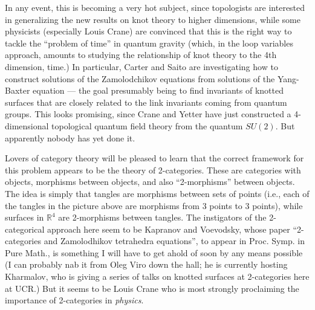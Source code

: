 \documentclass{article}
\def\tightlist{}
\renewcommand{\texttt}[1]{%
  \begingroup
  \ttfamily
  \begingroup\lccode`~=`/\lowercase{\endgroup\def~}{/\discretionary{}{}{}}%
  \begingroup\lccode`~=`[\lowercase{\endgroup\def~}{[\discretionary{}{}{}}%
  \begingroup\lccode`~=`.\lowercase{\endgroup\def~}{.\discretionary{}{}{}}%
  \catcode`/=\active\catcode`[=\active\catcode`.=\active
  \scantokens{#1\noexpand}%
  \endgroup
}
\begin{document}
In any event, this is becoming a very hot subject, since topologists are
interested in generalizing the new results on knot theory to higher
dimensions, while some physicists (especially Louis Crane) are convinced
that this is the right way to tackle the ``problem of time'' in quantum
gravity (which, in the loop variables approach, amounts to studying the
relationship of knot theory to the 4th dimension, time.) In particular,
Carter and Saito are investigating how to construct solutions of the
Zamolodchikov equations from solutions of the Yang-Baxter equation ---
the goal presumably being to find invariants of knotted surfaces that
are closely related to the link invariants coming from quantum groups.
This looks promising, since Crane and Yetter have just constructed a
4-dimensional topological quantum field theory from the quantum
\(SU(2)\). But apparently nobody has yet done it.

Lovers of category theory will be pleased to learn that the correct
framework for this problem appears to be the theory of 2-categories.
These are categories with objects, morphisms between objects, and also
``2-morphisms'' between objects. The idea is simply that tangles are
morphisms between sets of points (i.e., each of the tangles in the
picture above are morphisms from 3 points to 3 points), while surfaces
in \(\mathbb{R}^4\) are 2-morphisms between tangles. The instigators of
the 2-categorical approach here seem to be Kapranov and Voevodsky, whose
paper ``2-categories and Zamolodhikov tetrahedra equations'', to appear
in Proc. Symp. in Pure Math., is something I will have to get ahold of
soon by any means possible (I can probably nab it from Oleg Viro down
the hall; he is currently hosting Kharmalov, who is giving a series of
talks on knotted surfaces at 2-categories here at UCR.) But it seems to
be Louis Crane who is most strongly proclaiming the importance of
2-categories in \emph{physics}.

\end{document}
